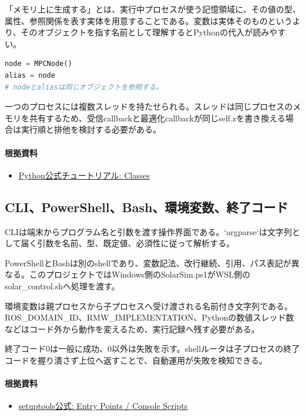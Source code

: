\documentclass[a4paper,11pt]{article}
\begin{document}
「メモリ上に生成する」とは、実行中プロセスが使う記憶領域に、その値の型、属性、参照関係を表す実体を用意することである。変数は実体そのものというより、そのオブジェクトを指す名前として理解するとPythonの代入が読みやすい。


\begin{lstlisting}[language=python]
node = MPCNode()
alias = node
# nodeとaliasは同じオブジェクトを参照する。
\end{lstlisting}


一つのプロセスには複数スレッドを持たせられる。スレッドは同じプロセスのメモリを共有するため、受信callbackと最適化callbackが同じself.zを書き換える場合は実行順と排他を検討する必要がある。

\paragraph{根拠資料}
\begin{itemize}[leftmargin=1.6em]
\item \href{https://docs.python.org/3/tutorial/classes.html}{Python公式チュートリアル: Classes}
\end{itemize}

\subsection{CLI、PowerShell、Bash、環境変数、終了コード}
CLIは端末からプログラム名と引数を渡す操作界面である。`argparse`は文字列として届く引数を名前、型、既定値、必須性に従って解析する。


PowerShellとBashは別のshellであり、変数記法、改行継続、引用、パス表記が異なる。このプロジェクトではWindows側のSolarSim.ps1がWSL側のsolar\_control.shへ処理を渡す。


環境変数は親プロセスから子プロセスへ受け渡される名前付き文字列である。ROS\_DOMAIN\_ID、RMW\_IMPLEMENTATION、Pythonの数値スレッド数などはコード外から動作を変えるため、実行記録へ残す必要がある。


終了コード0は一般に成功、0以外は失敗を示す。shellルータは子プロセスの終了コードを握り潰さず上位へ返すことで、自動運用が失敗を検知できる。

\paragraph{根拠資料}
\begin{itemize}[leftmargin=1.6em]
\item \href{https://setuptools.pypa.io/en/latest/userguide/entry_point.html}{setuptools公式: Entry Points / Console Scripts}
\end{itemize}
\end{document}
